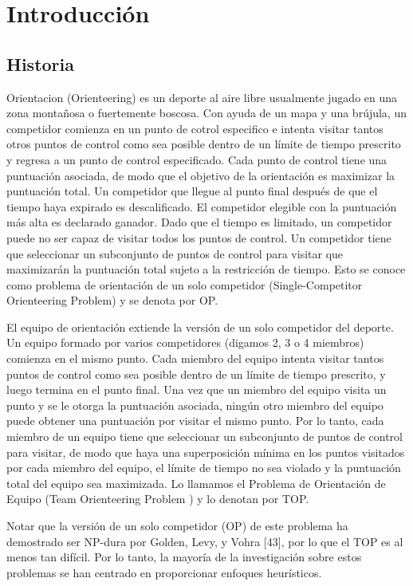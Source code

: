 \chapter{Introducción}

\section{Historia}

\cite{einstein} Orientacion (Orienteering) es un deporte al aire libre usualmente jugado en una zona montañosa o fuertemente boscosa. Con ayuda de un mapa y una brújula, un competidor comienza en un punto de cotrol especifico e intenta visitar tantos otros puntos de control como sea posible dentro de un límite de tiempo prescrito y regresa a un punto de control especificado. Cada punto de control tiene una puntuación asociada, de modo que el objetivo de la orientación es maximizar la puntuación total. Un competidor que llegue al punto final después de que el tiempo haya expirado es descalificado. El competidor elegible con la puntuación más alta es declarado ganador. Dado que el tiempo es limitado, un competidor puede no ser capaz de visitar todos los puntos de control. Un competidor tiene que seleccionar un subconjunto de puntos de control para visitar que maximizarán la puntuación total sujeto a la restricción de tiempo. Esto se conoce como problema de orientación de un solo competidor (Single-Competitor Orienteering Problem) y se denota por OP.

\bigskip

El equipo de orientación extiende la versión de un solo competidor del deporte. Un equipo formado por varios competidores (digamos 2, 3 o 4 miembros) comienza en el mismo punto. Cada miembro del equipo intenta visitar tantos puntos de control como sea posible dentro de un límite de tiempo prescrito, y luego termina en el punto final. Una vez que un miembro del equipo visita un punto y se le otorga la puntuación asociada, ningún otro miembro del equipo puede obtener una puntuación por visitar el mismo punto. Por lo tanto, cada miembro de un equipo tiene que seleccionar un subconjunto de puntos de control para visitar, de modo que haya una superposición mínima en los puntos visitados por cada miembro del equipo, el límite de tiempo no sea violado y la puntuación total del equipo sea maximizada. Lo llamamos el Problema de Orientación de Equipo (Team Orienteering Problem ) y lo denotan por TOP.

\bigskip

Notar que la versión de un solo competidor (OP) de este problema ha demostrado ser NP-dura por Golden, Levy, y Vohra [43], por lo que el TOP es al menos tan difícil. Por lo tanto, la mayoría de la investigación sobre estos problemas se han centrado en proporcionar enfoques heurísticos.

